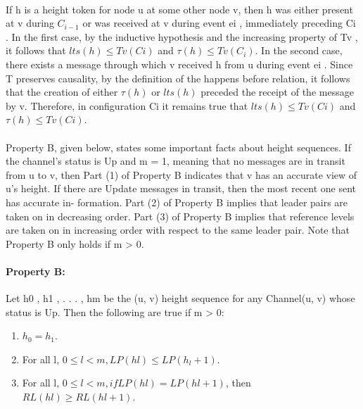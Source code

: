 \paragraph{}If h is a height token for node u at some other node v, then h was either present at v during $C_{i-1}$ or was received at v during event ei , immediately preceding Ci . In the first case, by the inductive hypothesis and the increasing property of Tv , it follows that $lts(h) \leq Tv (Ci )$ and $\tau (h) \leq Tv (C_i )$. In the second case, there exists a message through which v received h from u during event ei . Since T preserves causality, by the definition of the happens before relation, it follows that the creation of either $\tau (h)$ or $lts(h)$ preceded the receipt of the message by v. Therefore, in configuration Ci it remains true that $lts(h) \leq Tv (Ci )$ and $\tau (h) \leq Tv (Ci )$.
\paragraph{}Property B, given below, states some important facts about height sequences. If the channel’s status is Up and m = 1, meaning that no messages are in transit from u to v, then Part (1) of Property B indicates that v has an accurate view of u’s height. If there are Update messages in transit, then the most recent one sent has accurate in- formation. Part (2) of Property B implies that leader pairs are taken on in decreasing order. Part (3) of Property B implies that reference levels are taken on in increasing order with respect to the same leader pair. Note that Property B only holds if m > 0.
\paragraph{Property B:}Let h0 , h1 , . . . , hm be the (u, v) height sequence for any Channel(u, v) whose status is Up. Then the following are true if m > 0:
\begin{enumerate}
	\item $h_0 = h_1$.
	\item For all l, $0 \leq l < m, LP(hl ) \leq LP(h_l+1 )$.
	\item For all l, $0 \leq l < m, if LP(hl ) = LP(hl+1 )$, then $RL(hl ) \geq RL(hl+1 )$.
\end{enumerate}
